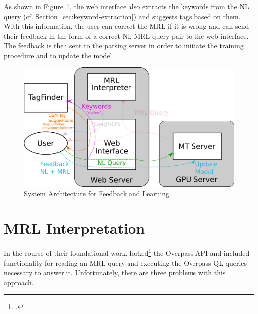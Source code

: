 As shown in Figure~\ref{fig:learning-architecture}, the web interface also
extracts the keywords from the NL query (cf.
Section~\ref{sec:keyword-extraction}) and suggests tags based on them. With this
information, the user can correct the MRL if it is wrong and can send their
feedback in the form of a correct NL-MRL query pair to the web interface. The
feedback is then sent to the parsing server in order to initiate the training
procedure and to update the model.

\begin{figure}[h]
  \centering
  \includegraphics[width=\textwidth]{fig/learning_architecture.png}
  \caption[Feedback \& Learning Architecture]{System Architecture for Feedback
    and Learning}
  \label{fig:learning-architecture}
\end{figure}

\section{MRL Interpretation}
\label{sec:mrl-interpretation}

In the course of their foundational work, \textcite{haas-2016}
forked\footcite{online-overpass-nlmaps} the Overpass API and included
functionality for reading an MRL query and executing the Overpass QL queries
necessary to answer it. Unfortunately, there are three problems with this
approach.

